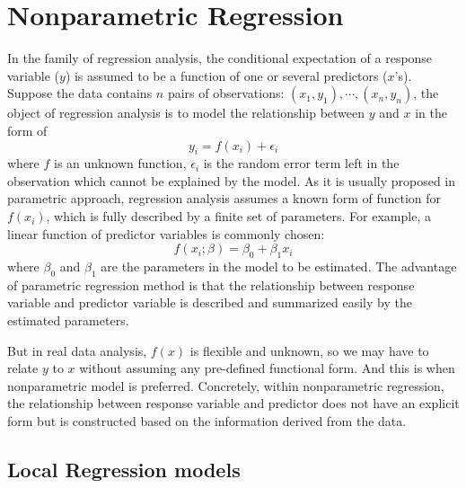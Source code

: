 \section{Nonparametric Regression}

In the family of regression analysis, the conditional expectation of a response 
variable ($y$) is assumed to be a function of one or several predictors ($x$'s). 
Suppose the data contains $n$ pairs of observations: 
$(x_1, y_1), \cdots, (x_n, y_n)$, the object of regression analysis is to model 
the relationship between $y$ and $x$ in the form of
\begin{equation} 
y_i = f(x_i) + \epsilon_i
\end{equation} 
where $f$ is an unknown function, $\epsilon_i$ is the random error term left in 
the observation which cannot be explained by the model. 
As it is usually proposed in parametric approach, regression analysis assumes a 
known form of function for $f(x_i)$, which is fully described by a finite 
set of parameters. For example, a linear function of predictor variables is 
commonly chosen:
\begin{equation} 
f(x_i;\beta) = \beta_0 + \beta_1x_i
\end{equation} 
where $\beta_0$ and $\beta_1$ are the parameters in the model to be estimated. 
The advantage of parametric regression method is that the relationship 
between response variable and predictor variable is described and summarized 
easily by the estimated parameters.

But in real data analysis, $f(x)$ is flexible and unknown, so we may have to 
relate $y$ to $x$ without assuming any pre-defined functional form. And this is 
when nonparametric model is preferred. Concretely, within nonparametric 
regression, the relationship between response variable and predictor does not 
have an explicit form but is constructed based on the information derived from
the data.


\subsection{Local Regression models}

